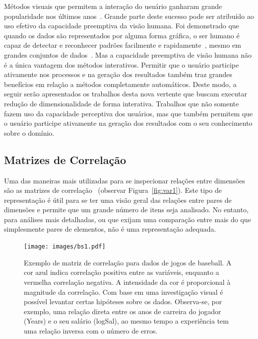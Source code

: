 Métodos visuais que permitem a interação do usuário ganharam grande popularidade nos últimos anos~\cite{State2012}. 
Grande parte deste sucesso pode ser atribuído ao uso efetivo da capacidade preemptiva da visão humana.
Foi demonstrado que quando os dados são representados por alguma forma gráfica, o ser humano é capaz de detectar e reconhecer padrões facilmente e rapidamente~\cite{Healey1995}, mesmo em grandes conjuntos de dados~\cite{Fodor2002}.
Mas a capacidade preemptiva de visão humana não é a única vantagem dos métodos interativos. Permitir que o usuário participe ativamente nos processos e na geração dos resultados também traz grandes benefícios em relação a métodos completamente automáticos.
Deste modo, a seguir serão apresentados os trabalhos desta nova vertente que buscam executar redução de dimensionalidade de forma interativa. Trabalhos que não somente fazem uso da capacidade perceptiva dos usuários, mas que também permitem que o usuário participe ativamente na geração dos resultados com o seu conhecimento sobre o domínio.

\subsection{Matrizes de Correlação}

Uma das maneiras mais utilizadas para se inspecionar relações entre dimensões são as matrizes de correlação~\cite{Friendly2002} (observar Figura~\ref{fig:var1}). Este tipo de representação é útil para se ter uma visão geral das relações entre pares de dimensões e permite que um grande número de itens seja analisado. No entanto, para análises mais detalhadas, ou que exijam uma comparação entre mais do que simplesmente pares de elementos, não é uma representação adequada.

\begin{figure}[h!]
    \centering
    \texttt{[image: images/bs1.pdf]}
    \caption[Matrizes de Correlação]{Exemplo de matriz de correlação para dados de jogos de baseball. A cor azul indica correlação positiva entre as variáveis, enquanto a vermelha correlação negativa. A intensidade da cor é proporcional à magnitude da correlação. Com base em uma investigação visual é possível levantar certas hipóteses sobre os dados. Observa-se, por exemplo, uma relação direta entre os anos de carreira do jogador (Years) e o seu salário (logSal), ao mesmo tempo a experiência tem uma relação inversa com o número de erros.} 
    \label{fig:bs1}
\end{figure}

